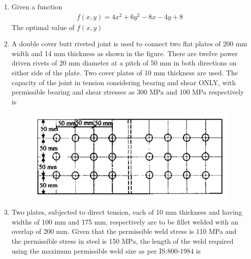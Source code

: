 \documentclass[journal,12pt,onecolumn]{IEEEtran}
\theoremstyle{remark}
\begin{document}
\begin{enumerate}
\noindent\item Given a function 
\begin{align*}
f(x, y) = 4x^2 + 6y^2 - 8x - 4y + 8
\end{align*}
The optimal value of $f(x, y)$
\hfill{}
\begin{enumerate}
\end{enumerate}
\noindent\item A double cover butt riveted joint is used to connect two flat plates of 200 mm width and 14 mm thickness as shown in the figure. There are twelve power driven rivets of 20 mm diameter at a pitch of 50 mm in both directions on either side of the plate. Two cover plates of 10 mm thickness are used. The capacity of the joint in tension considering bearing and shear ONLY, with permissible bearing and shear stresses as 300 MPa and 100 MPa respectively is
\hfill{}

\begin{figure}[H]
     \centering
     \includegraphics[scale=0.5]{figs/8332fb3c-532c-4d6c-a8c4-1f20c3321f4f.jpg} 
     \caption{}
     \label{fig:figure3}
 \end{figure}
\begin{enumerate}
\end{enumerate}
\noindent\item Two plates, subjected to direct tension, each of 10 mm thickness and having widths of 100 mm and 175 mm, respectively are to be fillet welded with an overlap of 200 mm. Given that the permissible weld stress is 110 MPa and the permissible stress in steel is 150 MPa, the length of the weld required using the maximum permissible weld size as per IS:800-1984 is \hfill{}


\end{enumerate}
\end{document}
